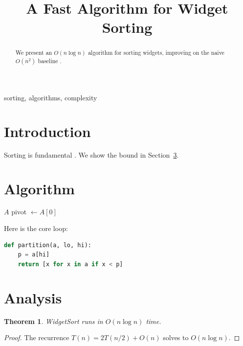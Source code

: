 \documentclass[conference]{IEEEtran}
\newtheorem{theorem}{Theorem}
\begin{document}
\title{A Fast Algorithm for Widget Sorting}
\author{}
\maketitle
\begin{abstract}
We present an $O(n \log n)$ algorithm for sorting widgets, improving on the naive $O(n^2)$ baseline \cite{knuth1998}.
\end{abstract}
\begin{IEEEkeywords}
sorting, algorithms, complexity
\end{IEEEkeywords}
\section{Introduction}
Sorting is fundamental \cite{cormen2009, knuth1998}. We show the bound in Section~\ref{sec:analysis}.
\section{Algorithm}
\begin{algorithm}
\caption{WidgetSort}\label{alg:sort}
\begin{algorithmic}[1]
   \State \Return $A$ \EndIf
  \State pivot $\gets A[0]$
\EndProcedure
\end{algorithmic}
\end{algorithm}
Here is the core loop:
\begin{lstlisting}[language=Python, caption={Partition step}, label={lst:part}]
def partition(a, lo, hi):
    p = a[hi]
    return [x for x in a if x < p]
\end{lstlisting}
\section{Analysis}\label{sec:analysis}
\begin{theorem}
WidgetSort runs in $O(n \log n)$ time.
\end{theorem}
\begin{proof}
The recurrence $T(n) = 2T(n/2) + O(n)$ solves to $O(n \log n)$.
\end{proof}


\end{document}
